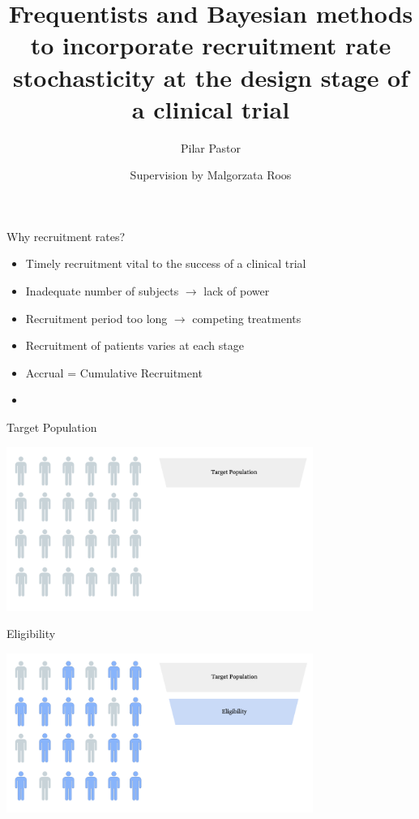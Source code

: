 \documentclass[english]{beamer}\usepackage[]{graphicx}\usepackage[]{xcolor}
\title[Recruitment rate stochasticity
at the design stage of a clinical trial]{Frequentists and Bayesian methods to incorporate
recruitment rate stochasticity
at the design stage of a clinical trial}
\author{Supervision by Malgorzata Roos}
\subtitle{Pilar Pastor}
\begin{document}
\maketitle


\begin{frame}{Why recruitment rates?}

\begin{itemize}
\item Timely recruitment vital to the success of a clinical trial
\item Inadequate number of subjects $\rightarrow$ lack of power
\item Recruitment period too long $\rightarrow$ competing treatments
\item Recruitment of patients varies at each stage 
\item Accrual = Cumulative Recruitment
\item \cite{carter2004application}
\end{itemize}


\end{frame}


\begin{frame}{Target Population}

\includegraphics[width=100mm,scale=1]{targetpop.png}

\end{frame}

\begin{frame}{Eligibility}

\includegraphics[width=100mm,scale=1]{eligibility.png}

\end{frame}
\end{document}
